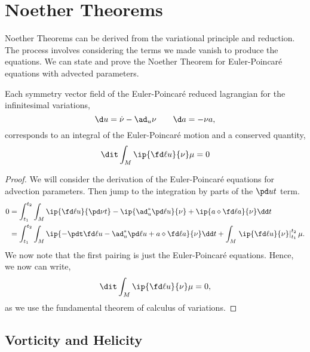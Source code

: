 \section{Noether Theorems}
Noether Theorems can be derived from the variational principle and reduction. The process involves considering the terms we made vanish to produce the equations. We can state and prove the Noether Theorem for Euler-Poincar\'e equations with advected parameters.
\begin{nthm}
  Each symmetry vector field of the Euler-Poincar\'e reduced lagrangian for the infinitesimal variations,
  $$ \d u = \dot \nu - \ad_u \nu \qquad \d a = -\nu a, $$
  corresponds to an integral of the Euler-Poincar\'e motion and a conserved quantity,
  $$ \dit \int_{M} \ip{\fd \ell u}{\nu}\mu = 0 $$
  \label{thm:n_ep_ap}
\end{nthm}
\begin{proof}
  We will consider the derivation of the Euler-Poincar\'e equations for advection parameters. Then jump to the integration by parts of the $\pd u t$ term.
  \begin{align*}
    0 &= \int_{t_1}^{t_2} \int_M \ip{\fd \ell u}{\pd \nu t} - \ip{\ad^*_u \pd \ell u}{\nu} + \ip{a \diamond \fd \ell a}{\nu} \dd t \\
    &= \int_{t_1}^{t_2} \int_M \ip{-\pdt\fd \ell u - \ad^*_u \pd \ell u + a \diamond \fd \ell a}{\nu} \dd t + \int_M\left. \ip{\fd \ell u}{\nu}\right|_{t_1}^{t_2} \mu.
  \end{align*}
  We now note that the first pairing is just the Euler-Poincar\'e equations. Hence, we now can write,
  $$ \dit \int_M \ip{\fd \ell u}{\nu} \mu = 0,$$
  as we use the fundamental theorem of calculus of variations.
\end{proof}

\subsection{Vorticity and Helicity}

